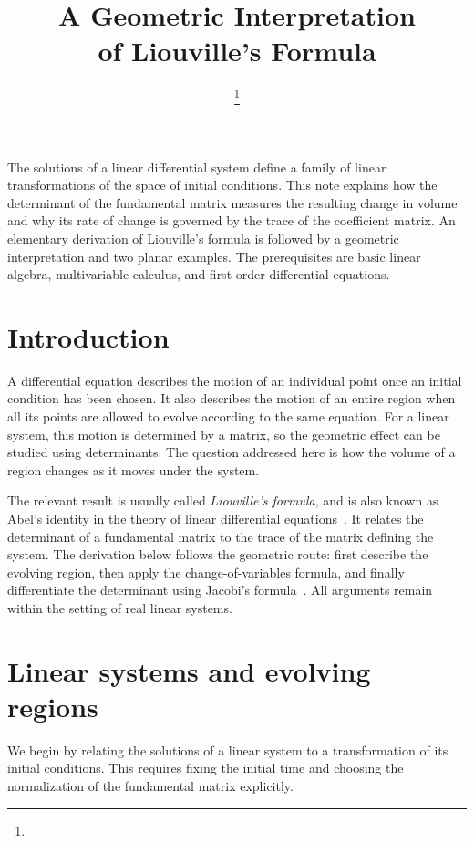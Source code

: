 \documentclass[a4paper,11pt]{article}
\title{A Geometric Interpretation\\of Liouville's Formula}
\author{\AuthorName\thanks{\AuthorFootnote}\\[0.45em]
  \small\AuthorAffiliation}
\date{}
\numberwithin{equation}{section}
\begin{document}
\maketitle

\noindent
The solutions of a linear differential system define a family of linear
transformations of the space of initial conditions. This note explains how
the determinant of the fundamental matrix measures the resulting change in
volume and why its rate of change is governed by the trace of the coefficient
matrix. An elementary derivation of Liouville's formula is followed by a
geometric interpretation and two planar examples. The prerequisites are
basic linear algebra, multivariable calculus, and first-order differential
equations.

\section{Introduction}
\label{sec:introduction}

A differential equation describes the motion of an individual point once an
initial condition has been chosen. It also describes the motion of an entire
region when all its points are allowed to evolve according to the same
equation. For a linear system, this motion is determined by a matrix, so the
geometric effect can be studied using determinants. The question addressed
here is how the volume of a region changes as it moves under the system.

The relevant result is usually called \emph{Liouville's formula}, and is also
known as Abel's identity in the theory of linear differential
equations~\cite[Sec.~3.4]{Teschl2012}. It relates the determinant of a
fundamental matrix to the trace of the matrix defining the system. The
derivation below follows the geometric route: first describe the evolving
region, then apply the change-of-variables formula, and finally differentiate
the determinant using Jacobi's formula~\cite[p.~1]{Kahan1998}. All arguments
remain within the setting of real linear systems.

\section{Linear systems and evolving regions}
\label{sec:linear}

We begin by relating the solutions of a linear system to a transformation
of its initial conditions. This requires fixing the initial time and choosing
the normalization of the fundamental matrix explicitly.
\end{document}
